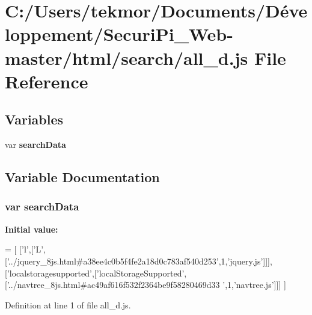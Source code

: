 \section{C\+:/\+Users/tekmor/\+Documents/\+Développement/\+Securi\+Pi\+\_\+\+Web-\/master/html/search/all\+\_\+d.js File Reference}
\label{all__d_8js}
\subsection*{Variables}
\begin{DoxyCompactItemize}
\item 
var {\bf search\+Data}
\end{DoxyCompactItemize}


\subsection{Variable Documentation}
\subsubsection[{search\+Data}]{\setlength{\rightskip}{0pt plus 5cm}var search\+Data}\label{all__d_8js_ad01a7523f103d6242ef9b0451861231e}
{\bfseries Initial value\+:}
\begin{DoxyCode}
=
[
  [\textcolor{charliteral}{'l'},[\textcolor{charliteral}{'L'},[\textcolor{stringliteral}{'../jquery\_8js.html#a38ee4c0b5f4fe2a18d0c783af540d253'},1,\textcolor{stringliteral}{'jquery.js'}]]],
  [\textcolor{stringliteral}{'localstoragesupported'},[\textcolor{stringliteral}{'localStorageSupported'},[\textcolor{stringliteral}{'../navtree\_8js.html#ac49af616f532f2364be9f58280469d33
      '},1,\textcolor{stringliteral}{'navtree.js'}]]]
]
\end{DoxyCode}


Definition at line 1 of file all\+\_\+d.\+js.

